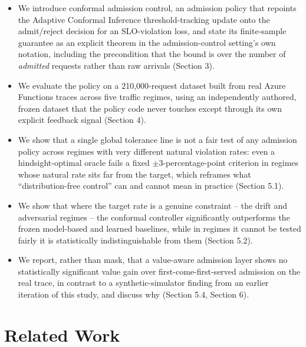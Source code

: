 \documentclass[11pt,letterpaper]{article}
\begin{document}
\begin{itemize}
\item We introduce conformal admission control, an admission policy that repoints the Adaptive Conformal Inference threshold-tracking update onto the admit/reject decision for an SLO-violation loss, and state its finite-sample guarantee as an explicit theorem in the admission-control setting's own notation, including the precondition that the bound is over the number of \textit{admitted} requests rather than raw arrivals (Section 3).
\item We evaluate the policy on a 210,000-request dataset built from real Azure Functions traces across five traffic regimes, using an independently authored, frozen dataset that the policy code never touches except through its own explicit feedback signal (Section 4).
\item We show that a single global tolerance line is not a fair test of any admission policy across regimes with very different natural violation rates: even a hindsight-optimal oracle fails a fixed $\pm$3-percentage-point criterion in regimes whose natural rate sits far from the target, which reframes what ``distribution-free control'' can and cannot mean in practice (Section 5.1).
\item We show that where the target rate is a genuine constraint -- the drift and adversarial regimes -- the conformal controller significantly outperforms the frozen model-based and learned baselines, while in regimes it cannot be tested fairly it is statistically indistinguishable from them (Section 5.2).
\item We report, rather than mask, that a value-aware admission layer shows no statistically significant value gain over first-come-first-served admission on the real trace, in contrast to a synthetic-simulator finding from an earlier iteration of this study, and discuss why (Section 5.4, Section 6).
\end{itemize}

\section{Related Work}
\end{document}
